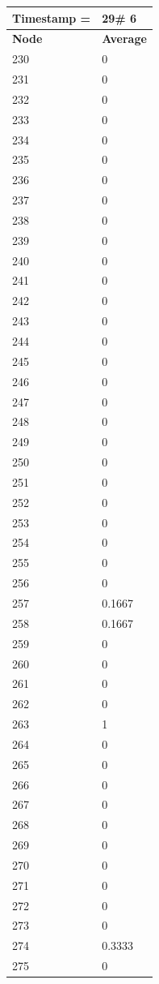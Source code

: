 \begin{tabular}{|l||l|}
\hline
\textbf{Timestamp =} & \textbf{29}\# 6\\\hline
	\textbf{Node} & \textbf{Average} \\ \hline
\hline
	230 & 0 \\ \hline
	231 & 0 \\ \hline
	232 & 0 \\ \hline
	233 & 0 \\ \hline
	234 & 0 \\ \hline
	235 & 0 \\ \hline
	236 & 0 \\ \hline
	237 & 0 \\ \hline
	238 & 0 \\ \hline
	239 & 0 \\ \hline
	240 & 0 \\ \hline
	241 & 0 \\ \hline
	242 & 0 \\ \hline
	243 & 0 \\ \hline
	244 & 0 \\ \hline
	245 & 0 \\ \hline
	246 & 0 \\ \hline
	247 & 0 \\ \hline
	248 & 0 \\ \hline
	249 & 0 \\ \hline
	250 & 0 \\ \hline
	251 & 0 \\ \hline
	252 & 0 \\ \hline
	253 & 0 \\ \hline
	254 & 0 \\ \hline
	255 & 0 \\ \hline
	256 & 0 \\ \hline
	257 & 0.1667 \\ \hline
	258 & 0.1667 \\ \hline
	259 & 0 \\ \hline
	260 & 0 \\ \hline
	261 & 0 \\ \hline
	262 & 0 \\ \hline
	263 & 1 \\ \hline
	264 & 0 \\ \hline
	265 & 0 \\ \hline
	266 & 0 \\ \hline
	267 & 0 \\ \hline
	268 & 0 \\ \hline
	269 & 0 \\ \hline
	270 & 0 \\ \hline
	271 & 0 \\ \hline
	272 & 0 \\ \hline
	273 & 0 \\ \hline
	274 & 0.3333 \\ \hline
	275 & 0 \\ \hline
\end{tabular}

